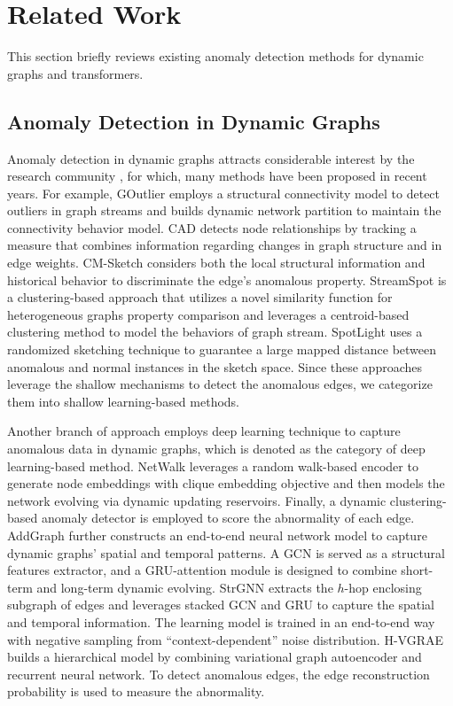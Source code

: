 \documentclass[10pt,journal,compsoc]{IEEEtran}
\newcommand{\yg}{}
\begin{document}
\section{Related Work} \label{sec:rw}

This section briefly reviews \yg{existing anomaly detection methods} for dynamic graphs and transformers.

\subsection{Anomaly Detection in Dynamic Graphs} \label{subsec:rw_ad}

Anomaly detection in dynamic graphs attracts considerable interest by the research community \cite{peng2021streaming}, for which, many methods \yg{have been proposed in recent years.}
For example, GOutlier \cite{aggarwal2011outlier} employs a structural connectivity model to detect outliers in graph streams and builds dynamic network partition to maintain the connectivity behavior model. 
CAD \cite{sricharan2014localizing} detects node relationships by tracking a measure that combines information regarding changes in graph structure \yg{and in edge} weights. 
CM-Sketch \cite{ranshous2016scalable} considers both the local structural information and historical behavior to discriminate the edge's anomalous property. 
StreamSpot \cite{manzoor2016fast} is a clustering-based approach that utilizes a novel similarity function for heterogeneous graphs property comparison and leverages a centroid-based clustering method to model the behaviors of graph stream. 
SpotLight \cite{eswaran2018spotlight} uses a randomized sketching technique to guarantee a large mapped distance between anomalous and normal instances in the sketch space. 
Since these approaches leverage the shallow mechanisms to detect the anomalous edges, we categorize them into shallow learning-based methods. 

Another branch of approach employs deep learning technique %
to capture anomalous data in dynamic graphs, which is denoted as the category of deep learning-based method. 
NetWalk \cite{yu2018netwalk} leverages a random walk-based encoder to generate node embeddings with clique embedding objective and then models the network evolving via dynamic updating reservoirs. Finally, a dynamic clustering-based anomaly detector is employed to score the abnormality of each edge.
AddGraph \cite{zheng2019addgraph} further constructs an end-to-end neural network model to capture dynamic graphs' spatial and temporal patterns. A GCN \cite{kipf2017semi} is served as a structural features extractor, and a GRU-attention module is designed to combine short-term and long-term dynamic evolving.
StrGNN \cite{cai2020structural} extracts the $h$-hop enclosing subgraph of edges and leverages stacked GCN \cite{kipf2017semi} and GRU to capture the spatial and temporal information. The learning model is trained in an end-to-end way with negative sampling from “context-dependent” noise distribution.
H-VGRAE \cite{yang2020h} builds a hierarchical model by combining variational graph autoencoder and recurrent neural network. To detect anomalous edges, the edge reconstruction probability is used to measure the abnormality.
\end{document}
